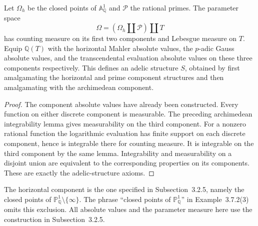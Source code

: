 \begin{definition}
\label{def:rational-function-adelic-curve}
\leanok
Let $\Omega_h$ be the closed points of $\mathbb A^1_{\mathbb Q}$ and
$\mathcal P$ the rational primes. The parameter space
\[
 \Omega=(\Omega_h\amalg\mathcal P)\amalg T
\]
has counting measure on its first two components and Lebesgue measure on
$T$. Equip $\mathbb Q(T)$ with the horizontal Mahler absolute values, the
$p$-adic Gauss absolute values, and the transcendental evaluation absolute
values on these three components respectively. This defines an adelic
structure $S$, obtained by first amalgamating the horizontal and prime
component structures and then amalgamating with the archimedean component.
\end{definition}
\begin{proof}
The component absolute values have already been constructed. Every function
on either discrete component is measurable. The preceding archimedean
integrability lemma gives measurability on the third component. For a nonzero
rational function the logarithmic evaluation has finite support on each
discrete component, hence is integrable there for counting measure. It is
integrable on the third component by the same lemma. Integrability and
measurability on a disjoint union are equivalent to the corresponding
properties on its components. These are exactly the adelic-structure axioms.
\end{proof}

\begin{remark}
The horizontal component is the one specified in Subsection~3.2.5, namely
the closed points of $\mathbb P^1_{\mathbb Q}\setminus\{\infty\}$.
The phrase ``closed points of $\mathbb P^1_{\mathbb Q}$'' in
Example~3.7.2(3) omits this exclusion. All absolute values and the parameter
measure here use the construction in Subsection~3.2.5.
\end{remark}

